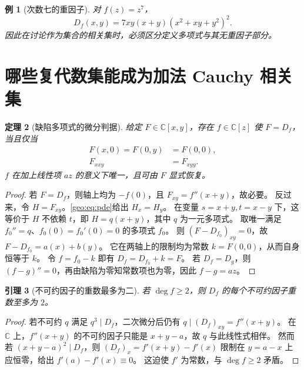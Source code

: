 \documentclass[11pt,a4paper,oneside,openany]{book}
\theoremstyle{lecture}
\newtheorem{theorem}{定理}[section]
\newtheorem{lemma}[theorem]{引理}
\newtheorem{example}[theorem]{例}
\newcommand{\C}{\mathbb C}
\numberwithin{equation}{section}
\begin{document}
\begin{example}[次数七的重因子]
对 $f(z)=z^7$，
\[
 D_f(x,y)=7xy(x+y)(x^2+xy+y^2)^2.
\]
因此在讨论作为集合的相关集时，必须区分定义多项式与其无重因子部分。
\end{example}

\section{哪些复代数集能成为加法 Cauchy 相关集}\label{geo:sec:realization}
\begin{theorem}[缺陷多项式的微分判据]\label{geo:thm:diffcriterion}
给定 $F\in\C[x,y]$，存在 $f\in\C[z]$ 使 $F=D_f$，当且仅当
\begin{align}
 F(x,0)=F(0,y)&=F(0,0),\label{geo:eq:axes}\\
 F_{xxy}&=F_{xyy}.\label{geo:eq:pde}
\end{align}
$f$ 在加上线性项 $az$ 的意义下唯一，且可由 $F$ 显式恢复。
\end{theorem}
\begin{proof}
若 $F=D_f$，则轴上均为 $-f(0)$，且 $F_{xy}=f''(x+y)$，故必要。
反过来，令 $H=F_{xy}$。\eqref{geo:eq:pde}给出 $H_x=H_y$。
在变量 $s=x+y,t=x-y$ 下，这等价于 $H$ 不依赖 $t$，即 $H=q(x+y)$，其中 $q$ 为一元多项式。
取唯一满足 $f_0''=q$、$f_0(0)=f_0'(0)=0$ 的多项式 $f_0$。
则 $(F-D_{f_0})_{xy}=0$，故 $F-D_{f_0}=a(x)+b(y)$。
它在两轴上的限制均为常数 $k=F(0,0)$，从而自身恒等于 $k$。
令 $f=f_0-k$ 即有 $D_f=D_{f_0}+k=F$。
若 $D_f=D_g$，则 $(f-g)''=0$，再由缺陷为零知常数项也为零，因此 $f-g=az$。
\end{proof}

\begin{lemma}[不可约因子的重数最多为二]\label{geo:lem:multiplicity}
若 $\deg f\ge2$，则 $D_f$ 的每个不可约因子重数至多为 $2$。
\end{lemma}
\begin{proof}
若不可约 $q$ 满足 $q^3\mid D_f$，二次微分后仍有 $q\mid(D_f)_{xy}=f''(x+y)$。
在 $\C$ 上，$f''(x+y)$ 的不可约因子只能是 $x+y-a$，故 $q$ 与此线性式相伴。
然而若 $(x+y-a)^2\mid D_f$，则 $(D_f)_x=f'(x+y)-f'(x)$ 限制在 $y=a-x$ 上应恒零，给出 $f'(a)-f'(x)\equiv0$。
这迫使 $f'$ 为常数，与 $\deg f\ge2$ 矛盾。
\end{proof}
\end{document}
